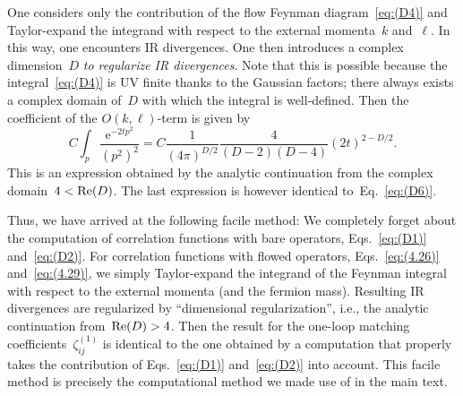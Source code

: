 One considers only the contribution of the flow Feynman diagram~\eqref{eq:(D4)}
and Taylor-expand the integrand with respect to the external momenta~$k$
and~$\ell$. In this way, one encounters IR divergences. One then introduces a
complex dimension~$D$ \emph{to regularize IR divergences}. Note that this is
possible because the integral~\eqref{eq:(D4)} is UV finite thanks to the
Gaussian factors; there always exists a complex domain of~$D$ with which the
integral is well-defined. Then the coefficient of the $O(k,\ell)$-term is given
by
\begin{equation}
   C\int_p\frac{\mathrm{e}^{-2tp^2}}{(p^2)^2}
   =C\frac{1}{(4\pi)^{D/2}}\frac{4}{(D-2)(D-4)}(2t)^{2-D/2}.
\label{eq:(D7)}
\end{equation}
This is an expression obtained by the analytic continuation from the complex
domain~$4<\operatorname{Re}(D)$. The last expression is however identical
to~Eq.~\eqref{eq:(D6)}.

Thus, we have arrived at the following facile method: We completely forget
about the computation of correlation functions with bare operators,
Eqs.~\eqref{eq:(D1)} and~\eqref{eq:(D2)}. For correlation functions with flowed
operators, Eqs.~\eqref{eq:(4.26)} and~\eqref{eq:(4.29)}, we simply
Taylor-expand the integrand of the Feynman integral with respect to the
external momenta (and the fermion mass). Resulting IR divergences are
regularized by ``dimensional regularization'', i.e., the analytic continuation
from~$\operatorname{Re}(D)>4$. Then the result for the one-loop matching
coefficients~$\zeta_{ij}^{(1)}$ is identical to the one obtained by a
computation that properly takes the contribution of Eqs.~\eqref{eq:(D1)}
and~\eqref{eq:(D2)} into account. This facile method is precisely the
computational method we made use of in the main text.

